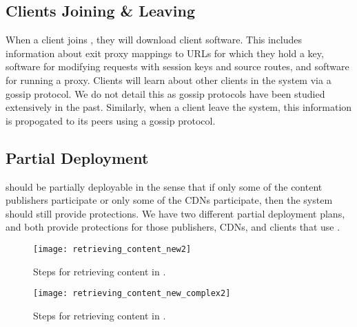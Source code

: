 \subsection{Clients Joining \& Leaving}
\label{sec:join}

When a client joins \system{}, they will download \system{} client software.  This includes information about exit proxy mappings to URLs for which they hold a key, 
software for modifying requests with session keys and source routes, and software for running a proxy.  Clients will learn about other clients in the system via 
a gossip protocol.  We do not detail this as gossip protocols have been studied extensively in the past.  Similarly, when a client leave the system, this 
information is propogated to its peers using a gossip protocol.

\subsection{Partial Deployment}
\label{sec:partial}
\system{} should be partially deployable in the sense that if only some of the content publishers participate or only some of the CDNs participate, then 
the system should still provide protections.  We have two different partial deployment plans, and both provide protections for those 
publishers, CDNs, and clients that use \system{}. 

\begin{figure}[t!]
\centering
\texttt{[image: retrieving\_content\_new2]}
\caption{Steps for retrieving content in \system{}.}
\label{fig:retrieving}
\end{figure}

\begin{figure}[t!]
\centering
\texttt{[image: retrieving\_content\_new\_complex2]}
\caption{Steps for retrieving content in \system{}.}
\label{fig:retrieving2}
\end{figure}

